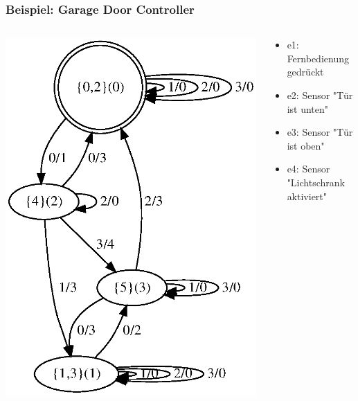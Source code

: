 \documentclass[10pt]{beamer}
\begin{document}
\begin{frame}
\frametitle{Beispiel: Garage Door Controller}
\begin{columns}[T] %
\begin{column}{.48\textwidth}

\includegraphics[width=\textwidth]{images/gdc_min}
\end{column}%
\hfill%
\begin{column}{.48\textwidth}
\begin{itemize}
  \item e1: Fernbedienung gedrückt
  \item e2: Sensor "Tür ist unten"
  \item e3: Sensor "Tür ist oben"
  \item e4: Sensor "Lichtschrank aktiviert"
\end{itemize}
\end{column}%
\end{columns}
\end{frame}
\end{document}
